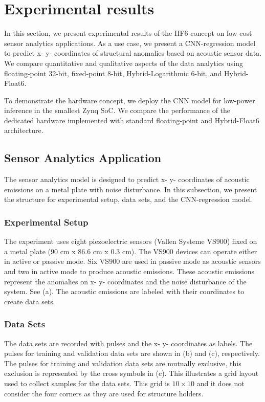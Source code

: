 \section{Experimental results}
\label{sec:experimental_results}
In this section, we present experimental results of the HF6 concept on low-cost sensor analytics applications. As a use case, we present a CNN-regression model to predict x- y- coordinates of structural anomalies based on acoustic sensor data. We compare quantitative and qualitative aspects of the data analytics using floating-point 32-bit, fixed-point 8-bit, Hybrid-Logarithmic 6-bit, and Hybrid-Float6.

To demonstrate the hardware concept, we deploy the CNN model for low-power inference in the smallest Zynq SoC. We compare the performance of the dedicated hardware implemented with standard floating-point and Hybrid-Float6 architecture.

\subsection{Sensor Analytics Application}
The sensor analytics model is designed to predict x- y- coordinates of acoustic emissions on a metal plate with noise disturbance. In this subsection, we present the structure for experimental setup, data sets, and the CNN-regression model.

\subsubsection{Experimental Setup}
The experiment uses eight piezoelectric sensors (Vallen Systeme VS900) fixed on a metal plate (90 cm x 86.6 cm x 0.3 cm). The VS900 devices can operate either in active or passive mode. Six VS900 are used in passive mode as acoustic sensors and two in active mode to produce acoustic emissions. These acoustic emissions represent the anomalies on x- y- coordinates and the noise disturbance of the system. See (a). The acoustic emissions are labeled with their coordinates to create data sets.

\subsubsection{Data Sets}
The data sets are recorded with pulses and the x- y- coordinates as labels. The pulses for training and validation data sets are shown in (b) and (c), respectively. The pulses for training and validation data sets are mutually exclusive, this exclusion is represented by the cross symbols in (c). This illustrates a grid layout used to collect samples for the data sets. This grid is $10\times10$ and it does not consider the four corners as they are used for structure holders.


